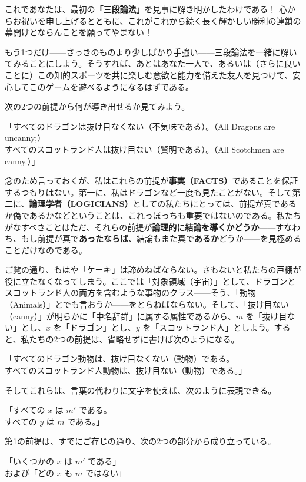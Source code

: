 \documentclass[a4paper,11pt,openany]{ltjsbook}
\begin{document}
これであなたは、最初の\textbf{「三段論法」}を見事に解き明かしたわけである！ 心からお祝いを申し上げるとともに、これがこれから続く長く輝かしい勝利の連鎖の幕開けとならんことを願ってやまない！

もう1つだけ——さっきのものより少しばかり手強い——三段論法を一緒に解いてみることにしよう。そうすれば、あとはあなた一人で、あるいは（さらに良いことに）この知的スポーツを共に楽しむ意欲と能力を備えた友人を見つけて、安心してこのゲームを遊べるようになるはずである。

次の2つの前提から何が導き出せるか見てみよう。
\begin{center}
「すべてのドラゴンは抜け目なくない（不気味である）。（All Dragons are uncanny;）\\
すべてのスコットランド人は抜け目ない（賢明である）。（All Scotchmen are canny.）」
\end{center}

念のため言っておくが、私はこれらの前提が\textbf{事実（FACTS）}であることを保証するつもりはない。第一に、私はドラゴンなど一度も見たことがない。そして第二に、\textbf{論理学者（LOGICIANS）}としての私たちにとっては、前提が真であるか偽であるかなどということは、これっぽっちも重要ではないのである。私たちがなすべきことはただ、それらの前提が\textbf{論理的に結論を導くかどうか}——すなわち、もし前提が真で\textbf{あったならば}、結論もまた真で\textbf{あるか}どうか——を見極めることだけなのである。

ご覧の通り、もはや「ケーキ」は諦めねばならない。さもないと私たちの戸棚が役に立たなくなってしまう。ここでは「対象領域（宇宙）」として、ドラゴンとスコットランド人の両方を含むような事物のクラス——そう、「動物（Animals）」とでも言おうか——をとらねばならない。そして、「抜け目ない（canny）」が明らかに「中名辞群」に属する属性であるから、$m$ を「抜け目ない」とし、$x$ を「ドラゴン」とし、$y$ を「スコットランド人」としよう。すると、私たちの2つの前提は、省略せずに書けば次のようになる。
\begin{center}
「すべてのドラゴン動物は、抜け目なくない（動物）である。\\
すべてのスコットランド人動物は、抜け目ない（動物）である。」
\end{center}

そしてこれらは、言葉の代わりに文字を使えば、次のように表現できる。
\begin{center}
「すべての $x$ は $m'$ である。\\
すべての $y$ は $m$ である。」
\end{center}

第1の前提は、すでにご存じの通り、次の2つの部分から成り立っている。
\begin{center}
「いくつかの $x$ は $m'$ である」\\
および「どの $x$ も $m$ ではない」
\end{center}
\end{document}
